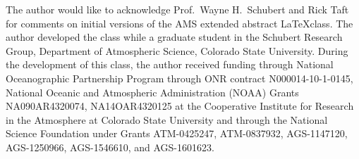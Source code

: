 \documentclass[9pt]{ametsocextabs}
\begin{document}
%
\acknowledgments
The author would like to acknowledge Prof.\ Wayne H.\ Schubert and
Rick Taft for comments on initial versions of the AMS extended
abstract \LaTeX class. The author developed the class while a
graduate student in the Schubert Research Group,
Department of Atmospheric Science, Colorado State University. During
the development of this class, the author received funding through
National Oceanographic Partnership Program through ONR contract
N000014-10-1-0145, National Oceanic and Atmospheric Administration
(NOAA) Grants NA090AR4320074, NA14OAR4320125 at the Cooperative
Institute for Research in the Atmosphere at Colorado State
University and through the National Science Foundation under Grants
ATM-0425247, ATM-0837932, AGS-1147120, AGS-1250966, AGS-1546610, and
AGS-1601623.



\end{document}

